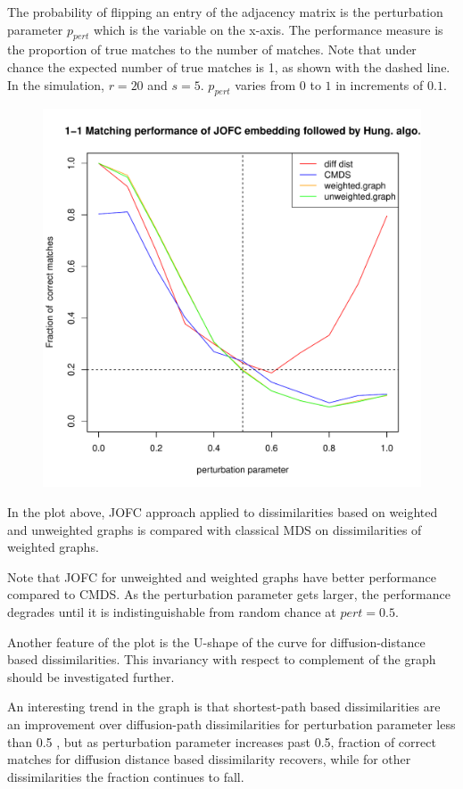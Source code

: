 \documentclass[11pt]{article} %
\begin{document}
  The probability of flipping an entry of the adjacency matrix is the perturbation parameter $p_{pert}$ which is the variable on the x-axis. 
  The performance measure is the proportion of true matches to the number of matches. Note that 
  under chance the expected number of true matches is 1, as shown with the dashed line. In the simulation, $r=20$ and $s=5$. $p_{pert}$ varies from $0$ to $1$ in increments of $0.1$. 
\begin{figure}
  \includegraphics[scale=0.65]{FidCommPapergraph-plot-1.pdf}
\end{figure}


In the plot above, JOFC approach applied to  dissimilarities based on weighted and unweighted graphs is compared with classical MDS on dissimilarities of weighted graphs.

Note that JOFC for unweighted and weighted graphs  have better performance compared to CMDS. As the perturbation parameter gets larger, the performance degrades until it is indistinguishable from random chance at $pert=0.5$.

Another feature of the plot is the U-shape of the curve for diffusion-distance based dissimilarities. This invariancy with respect to complement of the graph should be investigated further.

An interesting trend in the graph is that shortest-path based dissimilarities are an improvement over diffusion-path dissimilarities for perturbation parameter less than 0.5 , but as perturbation parameter increases past 0.5, fraction of correct matches for diffusion distance based dissimilarity recovers, while for other dissimilarities the fraction continues to fall. 
\end{document}
